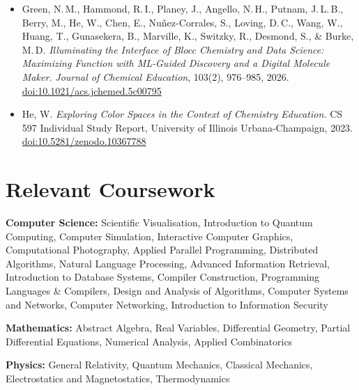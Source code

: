 \documentclass[11pt,letterpaper]{article}
\begin{document}
\begin{itemize}[leftmargin=*, itemsep=6pt, topsep=4pt]
  \item Green, N.\,M., Hammond, R.\,I., Planey, J., Angello, N.\,H., Putnam, J.\,L.\,B., Berry, M., He, W., Chen, E., Nu\~nez-Corrales, S., Loving, D.\,C., Wang, W., Huang, T., Gunasekera, B., Marville, K., Switzky, R., Desmond, S., \& Burke, M.\,D. \textit{Illuminating the Interface of Blocc Chemistry and Data Science: Maximizing Function with ML-Guided Discovery and a Digital Molecule Maker.} \textit{Journal of Chemical Education}, 103(2), 976--985, 2026. \href{https://doi.org/10.1021/acs.jchemed.5c00795}{doi:10.1021/acs.jchemed.5c00795}

  \item He, W. \textit{Exploring Color Spaces in the Context of Chemistry Education.} CS 597 Individual Study Report, University of Illinois Urbana-Champaign, 2023. \href{https://zenodo.org/records/10367788}{doi:10.5281/zenodo.10367788}
\end{itemize}

\section*{Relevant Coursework}

\textbf{Computer Science:} Scientific Visualisation, Introduction to Quantum Computing, Computer Simulation, Interactive Computer Graphics, Computational Photography, Applied Parallel Programming, Distributed Algorithms, Natural Language Processing, Advanced Information Retrieval, Introduction to Database Systems, Compiler Construction, Programming Languages \& Compilers, Design and Analysis of Algorithms, Computer Systems and Networks, Computer Networking, Introduction to Information Security

\textbf{Mathematics:} Abstract Algebra, Real Variables, Differential Geometry, Partial Differential Equations, Numerical Analysis, Applied Combinatorics

\textbf{Physics:} General Relativity, Quantum Mechanics, Classical Mechanics, Electrostatics and Magnetostatics, Thermodynamics
\end{document}
